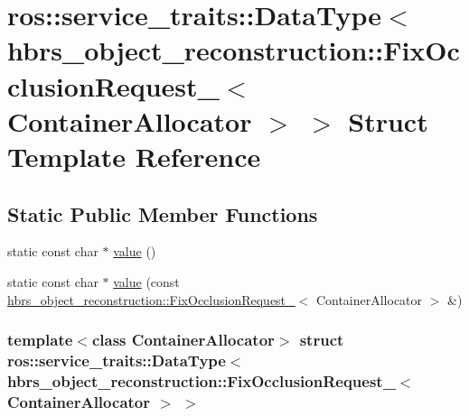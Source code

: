 \hypertarget{structros_1_1service__traits_1_1_data_type_3_01hbrs__object__reconstruction_1_1_fix_occlusion_re73b97b28e560381364e170bc00cac90c}{\section{ros\-:\-:service\-\_\-traits\-:\-:\-Data\-Type$<$ hbrs\-\_\-object\-\_\-reconstruction\-:\-:\-Fix\-Occlusion\-Request\-\_\-$<$ \-Container\-Allocator $>$ $>$ \-Struct \-Template \-Reference}
\label{structros_1_1service__traits_1_1_data_type_3_01hbrs__object__reconstruction_1_1_fix_occlusion_re73b97b28e560381364e170bc00cac90c}
}
\subsection*{\-Static \-Public \-Member \-Functions}
\begin{DoxyCompactItemize}
\item 
static const char $\ast$ \hyperlink{structros_1_1service__traits_1_1_data_type_3_01hbrs__object__reconstruction_1_1_fix_occlusion_re73b97b28e560381364e170bc00cac90c_a1d2e182a8da751347e58eb4037541574}{value} ()
\item 
static const char $\ast$ \hyperlink{structros_1_1service__traits_1_1_data_type_3_01hbrs__object__reconstruction_1_1_fix_occlusion_re73b97b28e560381364e170bc00cac90c_af694ac3b961b130ac1273486cedfa6c7}{value} (const \hyperlink{structhbrs__object__reconstruction_1_1_fix_occlusion_request__}{hbrs\-\_\-object\-\_\-reconstruction\-::\-Fix\-Occlusion\-Request\-\_\-}$<$ \-Container\-Allocator $>$ \&)
\end{DoxyCompactItemize}
\subsubsection*{template$<$class Container\-Allocator$>$ struct ros\-::service\-\_\-traits\-::\-Data\-Type$<$ hbrs\-\_\-object\-\_\-reconstruction\-::\-Fix\-Occlusion\-Request\-\_\-$<$ Container\-Allocator $>$ $>$}



